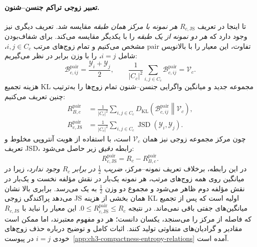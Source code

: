 \paragraph{تعبیر زوجی تراکم جنسن--شنون.}
تا اینجا در تعریف $R_{c,\mathrm{JS}}$
\emph{هر نمونه با مرکز همان طبقه} مقایسه شد.
تعریف دیگری نیز وجود دارد که
\emph{هر دو نمونه از یک طبقه} را با یکدیگر
مقایسه می‌کند. برای شفاف‌بودن تفاوت،
این معیار را با بالانویس $\mathrm{pair}$
مشخص می‌کنیم و تمام زوج‌های مرتب
$i,j\in C_c$، شامل $i=j$، را با
وزن برابر در نظر می‌گیریم:
\begin{equation}\label{eq:ch3-R-JS-pairwise-distributions}
\boxed{
\mathscr B_{c,ij}^{\mathrm{pair}}
=\frac{\mathscr Y_i+\mathscr Y_j}{2},
\qquad
\frac1{|C_c|^2}\sum_{i,j\in C_c}
\mathscr B_{c,ij}^{\mathrm{pair}}
=\mathcal V_c.
}
\end{equation}
هزینه تجمیع KL مجموعه جدید
و میانگین واگرایی جنسن--شنون تمام زوج‌ها را
به‌ترتیب چنین تعریف می‌کنیم:
\begin{equation}\label{eq:ch3-R-JS-pairwise-definitions}
\boxed{
\begin{aligned}
R_{B,c}^{\mathrm{pair}}
&=\frac1{|C_c|^2}\sum_{i,j\in C_c}
D_{\mathrm{KL}}\!
\left(\mathscr B_{c,ij}^{\mathrm{pair}}\middle\|
\mathcal V_c\right),\\
R_{c,\mathrm{JS}}^{\mathrm{pair}}
&=\frac1{|C_c|^2}\sum_{i,j\in C_c}
\operatorname{JSD}(\mathscr Y_i,\mathscr Y_j).
\end{aligned}}
\end{equation}
چون مرکز مجموعه زوجی نیز
همان $\mathcal V_c$ است،
با استفاده از هویت آنتروپی مخلوط
و تعریف JSD، رابطه \emph{دقیق}
زیر حاصل می‌شود:
\begin{equation}\label{eq:ch3-R-JS-pairwise-entropy-identity}
\boxed{
R_{c,\mathrm{JS}}^{\mathrm{pair}}
=R_c-R_{B,c}^{\mathrm{pair}}.
}
\end{equation}
در این رابطه، برخلاف تعریف نمونه--مرکز،
\emph{ضریب $\frac12$ در برابر $R_c$
وجود ندارد}، زیرا در میانگین روی
همه زوج‌های مرتب، هر نمونه یک‌بار
در نقش مؤلفه نخست و یک‌بار در نقش
مؤلفه دوم ظاهر می‌شود و مجموع دو
وزن $\frac12$ به یک می‌رسد.
برابری بالا نشان می‌دهد پراکندگی
زوجی JS همان بخشی از هزینه KL
اولیه است که پس از تجمیع میانگین‌های
جفتی باقی نمی‌ماند.
در نتیجه
$0\le R_{c,\mathrm{JS}}^{\mathrm{pair}}\le R_c$.
این معیار را نباید با
$R_{c,\mathrm{JS}}$ که فاصله از مرکز
را می‌سنجد، یکسان دانست؛
هر دو مفهوم معتبرند، اما
ممکن است مقادیر و گرادیان‌های
متفاوتی تولید کنند.
اثبات کامل و توضیح درباره حذف
زوج‌های خودی $i=j$ در
پیوست~\ref{app:ch3-compactness-entropy-relations}
آمده است.

